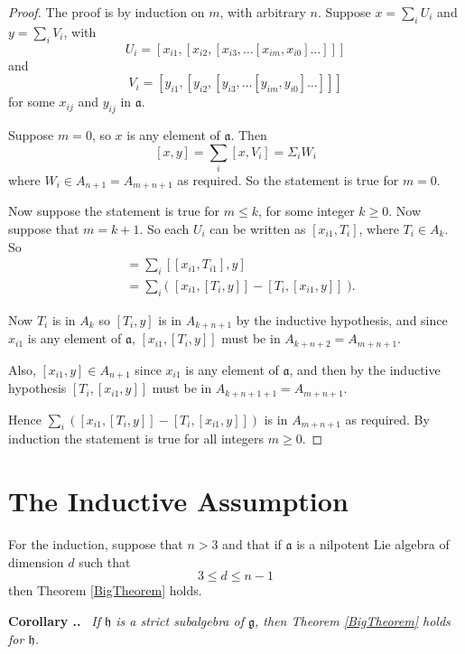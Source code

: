 \documentclass[honours]{UNSWthesis}
\newcommand{\g}{\mathfrak{g}}
\newcommand{\1}{\mathbf{e}_{1}}
\newcommand{\2}{\mathbf{e}_{3}}
\newcommand{\3}{\mathbf{e}_{3}}
\newcounter{Item}[section]
\newenvironment{Corollary}{\medskip
                            \refstepcounter{Item}
                            \noindent
                           {\bf Corollary \thesection.\theItem.}\ %
                            \begingroup \sl}
                           {\endgroup\medskip}
\begin{document}
\begin{proof}
The proof is by induction on $m$, with arbitrary $n$. Suppose $x=\sum\limits_{i} U_{i}$ and $y=\sum\limits_{i} V_{i}$, with 
\[
U_{i}=[x_{i1},[x_{i2},[x_{i3},\ldots [x_{im},x_{i0}]\ldots]]]
\]
and 
\[
V_{i}=[y_{i1},[y_{i2},[y_{i3},\ldots [y_{im},y_{i0}]\ldots]]]
\]
for some $x_{ij}$ and $y_{ij}$ in $\mathfrak{a}$.

Suppose $m=0$, so $x$ is any element of $\mathfrak{a}$. Then 
\[
[x,y]=\sum\limits_{i}[x,V_{i}]=\Sigma_{i}W_{i}
\]
where $W_{i} \in A_{n+1}=A_{m+n+1}$ as required. So the statement is true for $m=0$. \newline

Now suppose the statement is true for $m \leq k$, for some integer $k \geq 0$. Now suppose that $m=k+1$. So each $U_{i}$ can be written as $[x_{i1},T_{i}]$, where $T_{i} \in A_{k}$. So
\begin{align*}
[x,y] &=\sum\limits_{i}[[x_{i1},T_{i1}],y] \\
&= \sum\limits_{i}\big( \; [x_{i1},[T_{i},y]]-[T_{i},[x_{i1},y]]\; \big).
\end{align*}

Now $T_{i}$ is in $A_{k}$ so $[T_{i},y]$ is in $A_{k+n+1}$ by the inductive hypothesis, and since $x_{i1}$ is any element of $\mathfrak{a}$, $[x_{i1},[T_{i},y]]$ must be in $A_{k+n+2}=A_{m+n+1}$. 

Also, $[x_{i1},y] \in A_{n+1}$ since $x_{i1}$ is any element of $\mathfrak{a}$, and then by the inductive hypothesis $[T_{i},[x_{i1},y]]$ must be in $A_{k+n+1+1}=A_{m+n+1}$. 

Hence $\sum\limits_{i}([x_{i1},[T_{i},y]]-[T_{i},[x_{i1},y]])$ is in $A_{m+n+1}$ as required. By induction the statement is true for all integers $m \geq 0$.
\end{proof}


\section{The Inductive Assumption}
For the induction, suppose that $n > 3$ and that if $\mathfrak{a}$ is a nilpotent Lie algebra of dimension $d$ such that
\[
3 \leq d \leq n-1
\]
then Theorem \ref{BigTheorem} holds. 

\begin{Corollary}\label{CorReduceDim}
If $\mathfrak{h}$ is a strict subalgebra of $\g$, then Theorem \ref{BigTheorem} holds for $\mathfrak{h}$. 
\end{Corollary}
\end{document}
